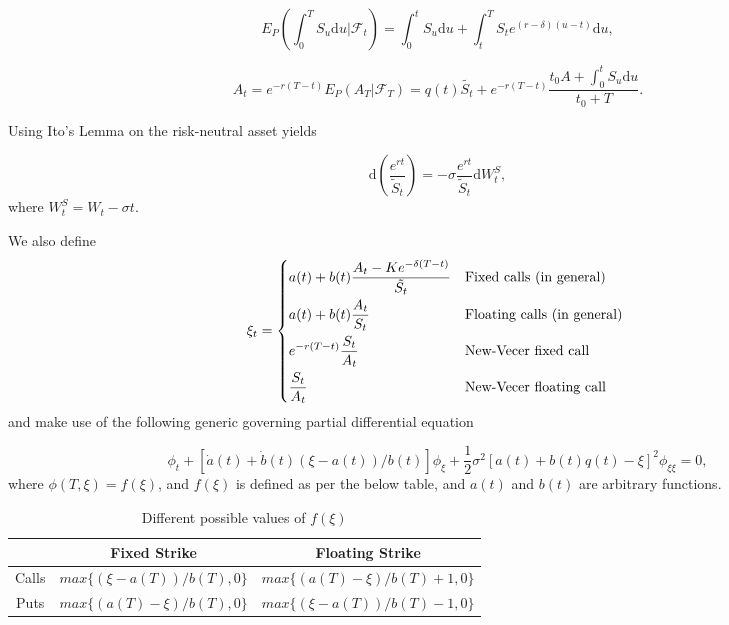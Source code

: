 \documentclass{article}
\begin{document}
\begin{equation}
  E_P(\int_0^TS_u\textrm{d}u | \mathcal{F}_t) = \int_0^t S_u \textrm{d}u + \int_t^T S_te^{(r-\delta)(u-t)}\textrm{d}u,
\end{equation}

\begin{equation}
  A_t = e^{-r(T-t)}E_P(A_T|\mathcal{F}_T) = q(t)\tilde{S_t} + e^{-r(T-t)} \frac{t_0 A + \int_0^tS_u\mathrm{d}u}{t_0+T}.
\end{equation}

Using Ito's Lemma on the risk-neutral asset yields

\begin{equation}
 \textrm{d}(\frac{e^{rt}}{\tilde{S}_t}) = -\sigma \frac{e^{rt}}{\tilde{S}_t}\textrm{d}W_t^S,
\end{equation}
where \(W_t^S = W_t - \sigma t\).

We also define
\begin{equation}
  \xi_t =
  \begin{dcases*}
    a(t) + b(t) \frac{A_t - Ke^{-\delta(T-t)}}{\tilde{S_t}} & Fixed calls (in general) \\
    a(t) + b(t) \frac{A_t}{S_t} & Floating calls (in general) \\
    e^{-r(T-t)}\frac{S_t}{A_t} & New-Vecer fixed call \\
    \frac{S_t}{A_t} & New-Vecer floating call
  \end{dcases*}
\end{equation}
and make use of the following generic governing partial differential equation

\begin{equation}
  \phi_t + [\dot{a}(t) + \dot{b}(t)(\xi - a(t))/b(t)]\phi_\xi + \frac{1}{2}\sigma^2[a(t)+b(t)q(t) - \xi]^2\phi_{\xi\xi} = 0,
\end{equation}
where \(\phi(T, \xi) = f(\xi)\), and \(f(\xi)\) is defined as per the below table, and \(a(t)\) and \(b(t)\) are arbitrary functions.

\begin{table}[H]
  \begin{tabular}{|c|c|c|}
    \hline
    & Fixed Strike & Floating Strike \\
    \hline
    Calls & \(max\{(\xi - a(T))/b(T), 0\}\) & \(max\{(a(T) - \xi)/b(T) + 1, 0\}\) \\
    Puts & \(max\{(a(T) - \xi)/b(T ), 0\}\) & \(max\{(\xi - a(T))/b(T) - 1, 0\}\)\\
    \hline
  \end{tabular}
  \caption{Different possible values of \(f(\xi)\)}
\end{table}
\end{document}
